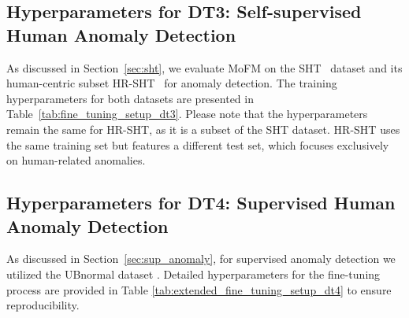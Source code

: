 \subsection{Hyperparameters for DT3: Self-supervised Human Anomaly Detection}
\label{appx:dt3}
As discussed in Section~\ref{sec:sht}, we evaluate MoFM on the SHT~\cite{liu2018future} dataset and its human-centric subset HR-SHT~\cite{morais2019learning} for anomaly detection. The training hyperparameters for both datasets are presented in Table~\ref{tab:fine_tuning_setup_dt3}. Please note that the hyperparameters remain the same for HR-SHT, as it is a subset of the SHT dataset. HR-SHT \cite{morais2019learning} uses the same training set but features a different test set, which focuses exclusively on human-related anomalies.


\subsection{Hyperparameters for DT4: Supervised Human Anomaly Detection}
\label{appx:dt4}
As discussed in Section~\ref{sec:sup_anomaly}, for supervised anomaly detection we utilized the UBnormal dataset \cite{Acsintoae_CVPR_2022}. Detailed hyperparameters for the fine-tuning process are provided in Table \ref{tab:extended_fine_tuning_setup_dt4} to ensure reproducibility.

